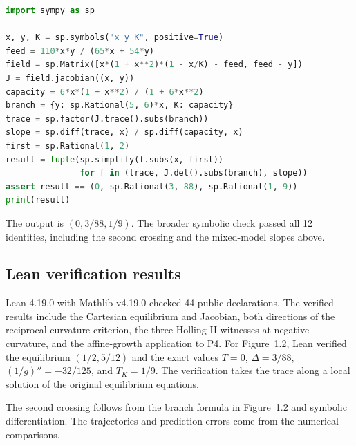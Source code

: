 \begin{lstlisting}[language=Python,basicstyle=\ttfamily\footnotesize]
import sympy as sp

x, y, K = sp.symbols("x y K", positive=True)
feed = 110*x*y / (65*x + 54*y)
field = sp.Matrix([x*(1 + x**2)*(1 - x/K) - feed, feed - y])
J = field.jacobian((x, y))
capacity = 6*x*(1 + x**2) / (1 + 6*x**2)
branch = {y: sp.Rational(5, 6)*x, K: capacity}
trace = sp.factor(J.trace().subs(branch))
slope = sp.diff(trace, x) / sp.diff(capacity, x)
first = sp.Rational(1, 2)
result = tuple(sp.simplify(f.subs(x, first))
               for f in (trace, J.det().subs(branch), slope))
assert result == (0, sp.Rational(3, 88), sp.Rational(1, 9))
print(result)
\end{lstlisting}
The output is $(0,3/88,1/9)$. The broader symbolic check passed all 12 identities, including the second crossing and the mixed-model slopes above.

\subsection*{Lean verification results}
Lean 4.19.0 with Mathlib v4.19.0 checked 44 public declarations. The verified results include the Cartesian equilibrium and Jacobian, both directions of the reciprocal-curvature criterion, the three Holling II witnesses at negative curvature, and the affine-growth application to P4. For Figure~1.2, Lean verified the equilibrium $(1/2,5/12)$ and the exact values $T=0$, $\Delta=3/88$, $(1/g)''=-32/125$, and $T_K=1/9$. The verification takes the trace along a local solution of the original equilibrium equations.

The second crossing follows from the branch formula in Figure~1.2 and symbolic differentiation. The trajectories and prediction errors come from the numerical comparisons.
